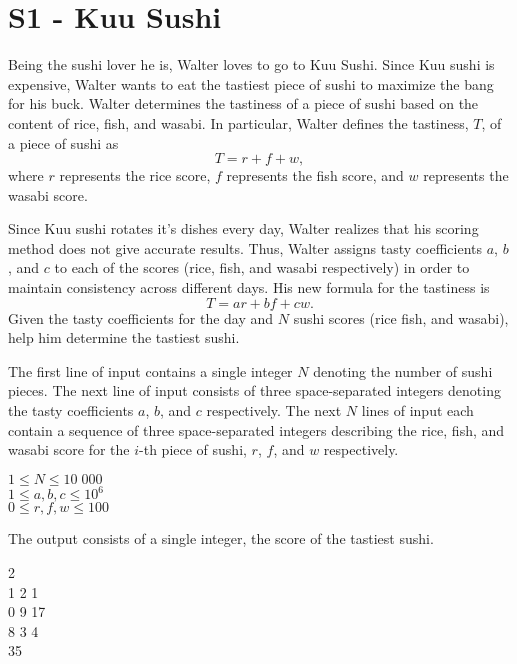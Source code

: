 \section*{S1 - Kuu Sushi}
Being the sushi lover he is, Walter loves to go to Kuu Sushi. Since Kuu sushi is expensive, Walter wants to eat the tastiest piece of sushi to maximize the bang for his buck. Walter determines the tastiness of a piece of sushi based on the content of rice, fish, and wasabi. In particular, Walter defines the tastiness, $T$, of a piece of sushi as $$T=r+f+w,$$ where $r$ represents the rice score, $f$ represents the fish score, and $w$ represents the wasabi score.

Since Kuu sushi rotates it's dishes every day, Walter realizes that his scoring method does not give accurate results. Thus, Walter assigns tasty coefficients $a$, $b$, and $c$ to each of the scores (rice, fish, and wasabi respectively) in order to maintain consistency across different days. His new formula for the tastiness is $$T=ar+bf+cw.$$ Given the tasty coefficients for the day and $N$ sushi scores (rice fish, and wasabi), help him determine the tastiest sushi.

The first line of input contains a single integer $N$ denoting the number of sushi pieces. The next line of input consists of three space-separated integers denoting the tasty coefficients $a$, $b$, and $c$ respectively. The next $N$ lines of input each contain a sequence of three space-separated integers describing the rice, fish, and wasabi score for the $i$-th piece of sushi, $r$, $f$, and $w$ respectively.

\constraints
$1 \leq N \leq 10\;000$ \\
$1 \leq a, b, c \leq 10^6$ \\
$0 \leq r, f, w \leq 100$

\outputformat
The output consists of a single integer, the score of the tastiest sushi.

\addsample
{
    2 \\
    1 2 1 \\ 
    0 9 17 \\
    8 3 4 \\
}
{
    35
}